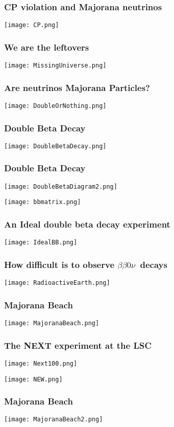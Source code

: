 \begin{frame}
\frametitle{CP violation and Majorana neutrinos}
\texttt{[image: CP.png]}
\end{frame}

\begin{frame}
\frametitle{We are the leftovers}
\texttt{[image: MissingUniverse.png]}
\end{frame}

\begin{frame}
\frametitle{Are neutrinos Majorana Particles?}
\texttt{[image: DoubleOrNothing.png]}
\end{frame}

\begin{frame}
\frametitle{Double Beta Decay}
\texttt{[image: DoubleBetaDecay.png]}
\end{frame}

\begin{frame}
\frametitle{Double Beta Decay}
\texttt{[image: DoubleBetaDiagram2.png]}

\texttt{[image: bbmatrix.png]}


\end{frame}



\begin{frame}
\frametitle{An Ideal double beta decay experiment}
\texttt{[image: IdealBB.png]}
\end{frame}

\begin{frame}
\frametitle{How difficult is to observe $\beta\beta0\nu$~decays}
\texttt{[image: RadioactiveEarth.png]}
\end{frame}

\begin{frame}
\frametitle{Majorana Beach}
\texttt{[image: MajoranaBeach.png]}
\end{frame}

\begin{frame}
\frametitle{The NEXT experiment at the LSC}
\texttt{[image: Next100.png]}
\end{frame}

\begin{frame}
\texttt{[image: NEW.png]}
\end{frame}

\begin{frame}
\frametitle{Majorana Beach}
\texttt{[image: MajoranaBeach2.png]}
\end{frame}
















